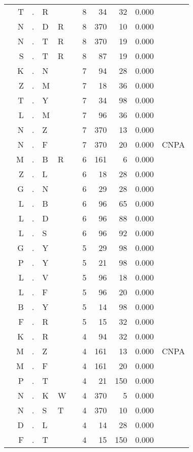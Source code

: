 \begin{longtable}{r@{ } r@{ } c@{ } l@{ } l@{ } l@{ } r r r r l }
 & T & . & R &  &  & 8 & 34 & 32 & 0.000 &  \\
 & N & . & D & R &  & 8 & 370 & 10 & 0.000 &  \\
 & N & . & T & R &  & 8 & 370 & 19 & 0.000 &  \\
 & S & . & T & R &  & 8 & 87 & 19 & 0.000 &  \\
 & K & . & N &  &  & 7 & 94 & 28 & 0.000 &  \\
 & Z & . & M &  &  & 7 & 18 & 36 & 0.000 &  \\
 & T & . & Y &  &  & 7 & 34 & 98 & 0.000 &  \\
 & L & . & M &  &  & 7 & 96 & 36 & 0.000 &  \\
 & N & . & Z &  &  & 7 & 370 & 13 & 0.000 &  \\
 & N & . & F &  &  & 7 & 370 & 20 & 0.000 & \textsc{CNPA} \\
 & M & . & B & R &  & 6 & 161 & 6 & 0.000 &  \\
 & Z & . & L &  &  & 6 & 18 & 28 & 0.000 &  \\
 & G & . & N &  &  & 6 & 29 & 28 & 0.000 &  \\
 & L & . & B &  &  & 6 & 96 & 65 & 0.000 &  \\
 & L & . & D &  &  & 6 & 96 & 88 & 0.000 &  \\
 & L & . & S &  &  & 6 & 96 & 92 & 0.000 &  \\
 & G & . & Y &  &  & 5 & 29 & 98 & 0.000 &  \\
 & P & . & Y &  &  & 5 & 21 & 98 & 0.000 &  \\
 & L & . & V &  &  & 5 & 96 & 18 & 0.000 &  \\
 & L & . & F &  &  & 5 & 96 & 20 & 0.000 &  \\
 & B & . & Y &  &  & 5 & 14 & 98 & 0.000 &  \\
 & F & . & R &  &  & 5 & 15 & 32 & 0.000 &  \\
 & K & . & R &  &  & 4 & 94 & 32 & 0.000 &  \\
 & M & . & Z &  &  & 4 & 161 & 13 & 0.000 & \textsc{CNPA} \\
 & M & . & F &  &  & 4 & 161 & 20 & 0.000 &  \\
 & P & . & T &  &  & 4 & 21 & 150 & 0.000 &  \\
 & N & . & K & W &  & 4 & 370 & 5 & 0.000 &  \\
 & N & . & S & T &  & 4 & 370 & 10 & 0.000 &  \\
 & D & . & L &  &  & 4 & 14 & 28 & 0.000 &  \\
 & F & . & T &  &  & 4 & 15 & 150 & 0.000 &  \\

\end{longtable}

